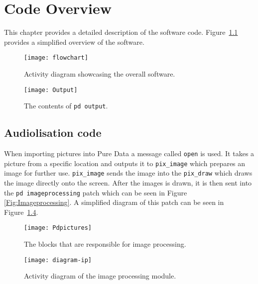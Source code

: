 \chapter{Code Overview}\label{ch:codeoverview}
This chapter provides a detailed description of the software code. Figure~\ref{fig:flowchart} provides a simplified overview of the software.

\begin{figure}
\centering
\texttt{[image: flowchart]}
\caption{Activity diagram showcasing the overall software.}
\label{fig:flowchart}
\end{figure}

\begin{figure}
\centering
\texttt{[image: Output]}
\caption{The contents of \texttt{pd output}.}
\label{Fig:Output}
\end{figure}

\section{Audiolisation code}
When importing pictures into Pure Data a message called \texttt{open} is used. It takes a picture from a specific location and outputs it to \texttt{pix\_image} which prepares an image for further use. \texttt{pix\_image} sends the image into the \texttt{pix\_draw} which draws the image directly onto the screen. After the images is drawn, it is then sent into the \texttt{pd imageprocessing} patch which can be seen in Figure \ref{Fig:Imageprocessing}. A simplified diagram of this patch can be seen in Figure~\ref{fig:ipflowchart}.

\begin{figure}
\centering
\texttt{[image: Pdpictures]}
\caption{The blocks that are responsible for image processing.}
\label{Fig:pdpicture}
\end{figure}

\begin{figure}
\centering
\texttt{[image: diagram-ip]}
\caption{Activity diagram of the image processing module.}
\label{fig:ipflowchart}
\end{figure}

